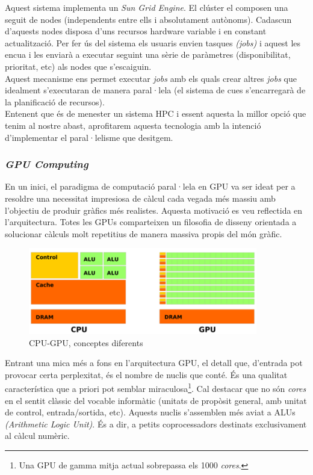 \documentclass[11pt,a4paper]{article}
\begin{document}
Aquest sistema implementa un \textit{Sun Grid Engine}. El clúster el composen una seguit de nodes (independents entre ells i absolutament autònoms). Cadascun d'aquests nodes disposa d'uns recursos hardware variable i en constant actualització. Per fer ús del sistema els usuaris envien tasques \textit{(jobs)} i aquest les encua i les enviarà a executar seguint una sèrie de paràmetres (disponibilitat, prioritat, etc) als nodes que s'escaiguin.
\\

Aquest mecanisme ens permet executar \textit{jobs} amb els quals crear altres \textit{jobs} que idealment s'executaran de manera paral·lela (el sistema de cues s'encarregarà de la planificació de recursos). 
\\

Entenent que és de menester un sistema HPC i essent aquesta la millor opció que tenim al nostre abast, aprofitarem aquesta tecnologia amb la intenció d'implementar el paral·lelisme que desitgem. 

\subsubsection{\textit{GPU Computing}}
En un inici, el paradigma de computació paral·lela en GPU va ser ideat per a resoldre una necessitat impresiosa de càlcul cada vegada més massiu amb l'objectiu de produir gràfics més realistes. Aquesta motivació es veu reflectida en l'arquitectura. Totes les GPUs comparteixen un filosofia de disseny orientada a solucionar càlculs molt repetitius de manera massiva propis del món gràfic.
\\

\begin{figure}[hbtp]
\centering
\includegraphics[width=10cm]{resources/cpu-gpu_w.png}
\caption{CPU-GPU, conceptes diferents}
\end{figure}

Entrant una mica més a fons en l'arquitectura GPU, el detall que, d'entrada pot provocar certa perplexitat, és el nombre de nuclis que conté. És una qualitat característica que a priori pot semblar  miraculosa\footnote{Una GPU de gamma mitja actual sobrepassa els 1000 \textit{cores}.}. Cal destacar que no són \textit{cores} en el sentit clàssic del vocable informàtic (unitats de propòsit general, amb unitat de control, entrada/sortida, etc). Aquests nuclis s'assemblen més aviat a ALUs \textit{(Arithmetic Logic Unit)}. És a dir, a petits coprocessadors destinats exclusivament al càlcul numèric.
\\
\end{document}
